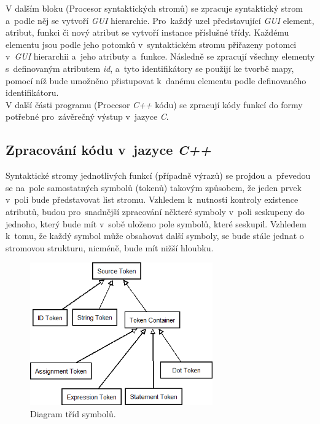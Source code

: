 \documentclass[11pt,twoside,a4paper]{book}
\begin{document}
V dalším bloku (Procesor syntaktických stromů) se zpracuje syntaktický strom a~podle něj se vytvoří \textit{GUI} hierarchie. Pro~každý uzel představující \textit{GUI} element, atribut, funkci či nový atribut se vytvoří instance příslušné třídy. Každému elementu jsou podle jeho potomků v~syntaktickém stromu přiřazeny potomci v~\textit{GUI} hierarchii a~jeho atributy a~funkce.
Následně se zpracují všechny elementy s~definovaným atributem \textit{id}, a~tyto identifikátory se použijí ke tvorbě mapy, pomocí níž bude umožněno přistupovat k~danému elementu podle definovaného identifikátoru.\\
V další části programu (Procesor \textit{C++} kódu) se zpracují kódy funkcí do formy potřebné pro~závěrečný výstup v~jazyce \textit{C}.

\subsection{\label{SEC:tokens}Zpracování kódu v~jazyce \textit{C++}}
Syntaktické stromy jednotlivých funkcí (případně výrazů) se projdou a~převedou se na~pole samostatných symbolů (tokenů) takovým způsobem, že jeden prvek v~poli bude představovat list stromu. Vzhledem k~nutnosti kontroly existence atributů, budou pro~snadnější zpracování některé symboly v~poli seskupeny do jednoho, který bude mít v~sobě uloženo pole symbolů, které seskupil. Vzhledem k~tomu, že každý symbol může obsahovat další symboly, se bude stále jednat o stromovou strukturu, nicméně, bude mít nižší hloubku.\\
\begin{figure}[!ht]
\begin{center}
  \includegraphics[width=0.7\textwidth]{tokens}
\caption{{\label{fig:fig2}}Diagram tříd symbolů.}
\end{center}
\end{figure}
\end{document}
